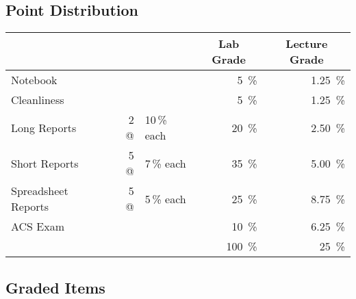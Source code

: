\documentclass[11pt,letterpaper]{article}
\begin{document}
\subsection{Point Distribution}
\begin{tabular} {l r@{~}l r<{\,\%} | r<{\,\%}}
	&&& \multicolumn{1}{c}{\sffamily\textbf{Lab Grade}} &
	\multicolumn{1}{c}{\sffamily\textbf{Lecture Grade}} \\ \midrule
	Notebook            & & &  5 & 1.25 \\
	Cleanliness         & & &  5 & 1.25 \\
	Long Reports        & 2 @ & 10\,\% each & 20 & 2.50 \\
	Short Reports       & 5 @ & 7\,\% each & 35  & 5.00 \\
	Spreadsheet Reports & 5 @ & 5\,\% each & 25  & 8.75 \\
	ACS Exam            & & & 10               & 6.25 \\ \midrule
			    &&& 100 & 25
\end{tabular}

\subsection{Graded Items}
\end{document}
